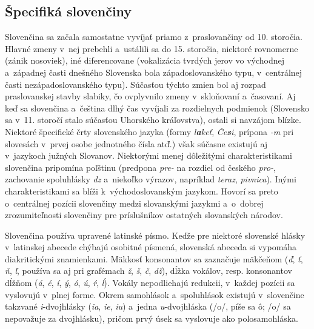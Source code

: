 \begin{multicols}{2}
\subsection{Špecifiká slovenčiny}
Slovenčina sa začala samostatne vyvíjať priamo z~praslovančiny od 10. storočia. Hlavné zmeny v~nej prebehli a~ustálili sa do 15. storočia, niektoré rovnomerne (zánik nosoviek), iné diferencovane (vokalizácia tvrdých jerov vo východnej a~západnej časti dnešného Slovenska bola západoslovanského typu, v~centrálnej časti nezápadoslovanského typu). Súčasťou týchto zmien bol aj rozpad praslovanskej stavby slabiky, čo ovplyvnilo zmeny v~skloňovaní a~časovaní. Aj keď sa slovenčina a~čeština dlhý čas vyvíjali za rozdielnych podmienok (Slovensko sa v~11. storočí stalo súčasťou Uhorského kráľovstva), ostali si navzájom blízke. Niektoré špecifické črty slovenského jazyka (formy \emph{l\textbf{a}keť}, \emph{Če\textbf{s}i}, prípona \emph{-m} pri slovesách v~prvej osobe jednotného čísla atď.) však súčasne existujú aj v~jazykoch južných Slovanov. Niektorými menej dôležitými charakteristikami slovenčina pripomína poľštinu (predpona \emph{pre-} na rozdiel od českého \emph{pro-}, zachovanie spoluhlásky \emph{dz} a~niekoľko výrazov, napríklad \emph{teraz}, \emph{pivnica}). Inými charakteristikami sa blíži k~východoslovanským jazykom. Hovorí sa preto o~centrálnej pozícii slovenčiny medzi slovanskými jazykmi a~o~dobrej zrozumiteľnosti slovenčiny pre príslušníkov ostatných slovanských národov.


Slovenčina používa upravené latinské písmo. Keďže pre niektoré slovenské hlásky v~latinskej abecede chýbajú osobitné písmená, slovenská abeceda si vypomáha diakritickými znamienkami. Mäkkosť konsonantov sa zaznačuje mäkčeňom (\emph{ď}, \emph{ť}, \emph{ň}, \emph{ľ}, používa sa aj pri grafémach \emph{ž}, \emph{š}, \emph{č}, \emph{dž}), dĺžka vokálov, resp. konsonantov dĺžňom (\emph{á}, \emph{é}, \emph{í}, \emph{ý}, \emph{ó}, \emph{ú}, \emph{ŕ}, \emph{ĺ}). Vokály nepodliehajú redukcii, v~každej pozícii sa vyslovujú v~plnej forme. Okrem samohlások a~spoluhlások existujú v~slovenčine takzvané \emph{i}-dvojhlásky (\emph{ia}, \emph{ie}, \emph{iu}) a~jedna \emph{u}-dvojhláska (/o/, píše sa ô; /o/ sa nepovažuje za dvojhlásku), pričom prvý úsek sa vyslovuje ako polosamohláska.



\end{multicols}
